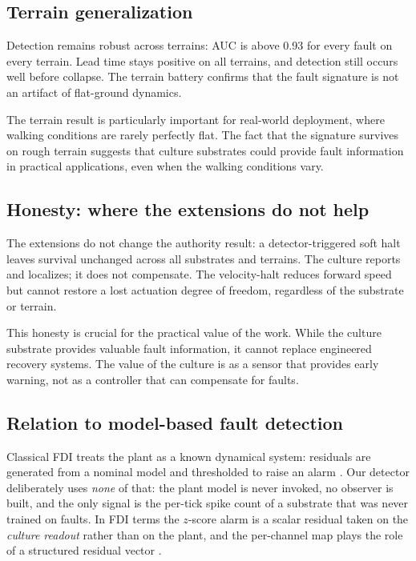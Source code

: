 \subsection{Terrain generalization}

Detection remains robust across terrains: AUC is above 0.93 for every fault
on every terrain. Lead time stays positive on all terrains, and detection
still occurs well before collapse. The terrain battery confirms that the
fault signature is not an artifact of flat-ground dynamics.

The terrain result is particularly important for real-world deployment, where
walking conditions are rarely perfectly flat. The fact that the signature
survives on rough terrain suggests that culture substrates could provide fault
information in practical applications, even when the walking conditions vary.

\subsection{Honesty: where the extensions do not help}

The extensions do not change the authority result: a detector-triggered soft
halt leaves survival unchanged across all substrates and terrains. The culture
reports and localizes; it does not compensate. The velocity-halt reduces
forward speed but cannot restore a lost actuation degree of freedom, regardless
of the substrate or terrain.

This honesty is crucial for the practical value of the work. While the culture
substrate provides valuable fault information, it cannot replace engineered
recovery systems. The value of the culture is as a sensor that provides early
warning, not as a controller that can compensate for faults.

\subsection{Relation to model-based fault detection}

Classical FDI treats the plant as a known dynamical system: residuals are
generated from a nominal model and thresholded to raise an alarm
\cite{venkatasubramanian2003, isermann2005, chen1999}. Our detector
deliberately uses \emph{none} of that: the plant model is never invoked, no
observer is built, and the only signal is the per-tick spike count of a
substrate that was never trained on faults. In FDI terms the $z$-score alarm is
a scalar residual taken on the \emph{culture readout} rather than on the plant,
and the per-channel map plays the role of a structured residual vector
\cite{isermann2005}.

